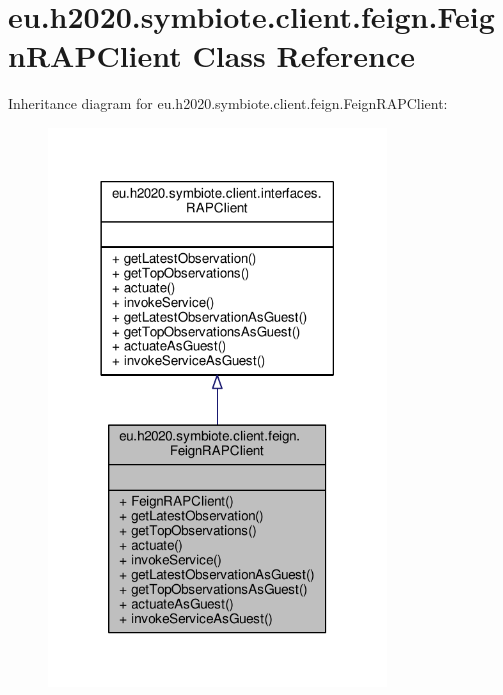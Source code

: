 \hypertarget{classeu_1_1h2020_1_1symbiote_1_1client_1_1feign_1_1FeignRAPClient}{}\section{eu.\+h2020.\+symbiote.\+client.\+feign.\+Feign\+R\+A\+P\+Client Class Reference}
\label{classeu_1_1h2020_1_1symbiote_1_1client_1_1feign_1_1FeignRAPClient}


Inheritance diagram for eu.\+h2020.\+symbiote.\+client.\+feign.\+Feign\+R\+A\+P\+Client\+:
\nopagebreak
\begin{figure}[H]
\begin{center}
\leavevmode
\includegraphics[width=254pt]{classeu_1_1h2020_1_1symbiote_1_1client_1_1feign_1_1FeignRAPClient__inherit__graph}
\end{center}
\end{figure}


